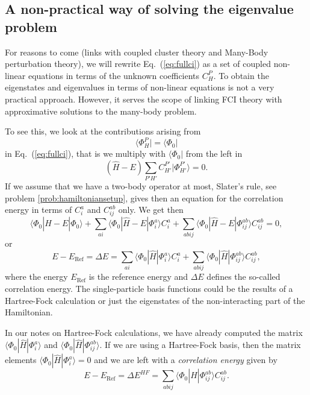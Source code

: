 \subsection{A non-practical way of solving the eigenvalue problem}

For reasons to come (links with coupled cluster theory and Many-Body perturbation theory), 
we will rewrite Eq.~(\ref{eq:fullci}) as a set of coupled non-linear equations in terms of the unknown coefficients $C_H^P$. 
To obtain the eigenstates and eigenvalues in terms of non-linear equations is not a very practical approach. However, it serves the scope of linking FCI theory with approximative solutions to the many-body problem.

To see this, we look at the contributions arising from 
\[
\langle \Phi_H^P | = \langle \Phi_0|
\]
in  Eq.~(\ref{eq:fullci}), that is we multiply with $\langle \Phi_0 |$
from the left in 
\[
(\hat{H} -E)\sum_{P'H'}C_{H'}^{P'}|\Phi_{H'}^{P'} \rangle=0. 
\]
If we assume that we have a two-body operator at most, Slater's rule, see  problem \ref{prob:hamiltoniansetup}, gives then an equation for the 
correlation energy in terms of $C_i^a$ and $C_{ij}^{ab}$ only.  We get then
\[
\langle \Phi_0 | \hat{H} -E| \Phi_0\rangle + \sum_{ai}\langle \Phi_0 | \hat{H} -E|\Phi_{i}^{a} \rangle C_{i}^{a}+
\sum_{abij}\langle \Phi_0 | \hat{H} -E|\Phi_{ij}^{ab} \rangle C_{ij}^{ab}=0,
\]
or 
\[
E-E_{\mathrm{Ref}} =\Delta E=\sum_{ai}\langle \Phi_0 | \hat{H}|\Phi_{i}^{a} \rangle C_{i}^{a}+
\sum_{abij}\langle \Phi_0 | \hat{H}|\Phi_{ij}^{ab} \rangle C_{ij}^{ab},
\]
where the energy $E_{\mathrm{Ref}}$ is the reference energy and
$\Delta E$ defines the so-called correlation energy.  The
single-particle basis functions could be the results of a Hartree-Fock
calculation or just the eigenstates of the non-interacting part of the
Hamiltonian.

In our notes on Hartree-Fock calculations, we have already computed
the matrix $\langle \Phi_0 | \hat{H}|\Phi_{i}^{a}\rangle $ and
$\langle \Phi_0 | \hat{H}|\Phi_{ij}^{ab}\rangle$.  If we are using a
Hartree-Fock basis, then the matrix elements $\langle \Phi_0 |
\hat{H}|\Phi_{i}^{a}\rangle=0$ and we are left with a
\emph{correlation energy} given by
\[
E-E_{\mathrm{Ref}} =\Delta E^{HF}=\sum_{abij}\langle \Phi_0 | \hat{H}|\Phi_{ij}^{ab} \rangle C_{ij}^{ab}. 
\]


